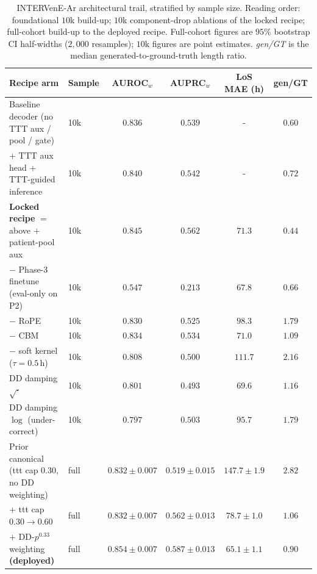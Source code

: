\begin{table}[htbp]
\caption{INTERVenE-Ar architectural trail, stratified by sample size. Reading order: foundational $10$k build-up; $10$k component-drop ablations of the locked recipe; full-cohort build-up to the deployed recipe. Full-cohort figures are $95\%$ bootstrap CI half-widths ($2{,}000$ resamples); $10$k figures are point estimates. \emph{gen/GT} is the median generated-to-ground-truth length ratio.}
\label{tab:abl-ar-all}
\centering
\singlespacing
\small
\setlength{\tabcolsep}{4pt}
\begin{tabular}{llcccc}
\toprule
Recipe arm & Sample & AUROC$_w$ & AUPRC$_w$ & LoS MAE (h) & gen/GT \\
\midrule
Baseline decoder (no TTT aux / pool / gate)      & 10k  & $0.836$                    & $0.539$                    & -                       & $0.60$ \\
\quad $+$ TTT aux head $+$ TTT-guided inference  & 10k  & $0.840$                    & $0.542$                    & -                       & $0.72$ \\
\midrule
\textbf{Locked recipe} $=$ above $+$ patient-pool aux & 10k  & $\mathbf{0.845}$      & $\mathbf{0.562}$           & $71.3$                  & $0.44$ \\
\quad $-$ Phase-3 finetune (eval-only on P2)     & 10k  & $0.547$                    & $0.213$                    & $67.8$                  & $0.66$ \\
\quad $-$ RoPE                                   & 10k  & $0.830$                    & $0.525$                    & $98.3$                  & $1.79$ \\
\quad $-$ CBM                                    & 10k  & $0.834$                    & $0.534$                    & $71.0$                  & $1.09$ \\
\quad $-$ soft kernel ($\tau{=}0.5$\,h)          & 10k  & $0.808$                    & $0.500$                    & $111.7$                 & $2.16$ \\
\quad DD damping $\sqrt{\cdot}$                  & 10k  & $0.801$                    & $0.493$                    & $69.6$                  & $1.16$ \\
\quad DD damping $\log$ (under-correct)          & 10k  & $0.797$                    & $0.503$                    & $95.7$                  & $1.79$ \\
\midrule
Prior canonical (ttt cap $0.30$, no DD weighting) & full & $0.832{\pm}0.007$         & $0.519{\pm}0.015$          & $147.7{\pm}1.9$         & $2.82$ \\
\quad $+$ ttt cap $0.30{\to}0.60$                & full & $0.832{\pm}0.007$          & $0.562{\pm}0.013$          & $78.7{\pm}1.0$          & $1.06$ \\
\quad $+$ DD-$p^{0.33}$ weighting \textbf{(deployed)} & full & $\mathbf{0.854{\pm}0.007}$ & $\mathbf{0.587{\pm}0.013}$ & $\mathbf{65.1{\pm}1.1}$ & $\mathbf{0.90}$ \\
\bottomrule
\end{tabular}
\end{table}

